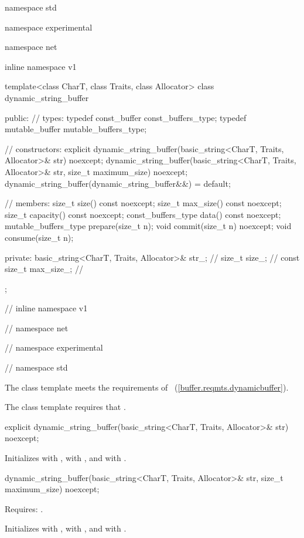 \begin{codeblock}
namespace std {
namespace experimental {
namespace net {
inline namespace v1 {

  template<class CharT, class Traits, class Allocator>
  class dynamic_string_buffer
  {
  public:
    // types:
    typedef const_buffer const_buffers_type;
    typedef mutable_buffer mutable_buffers_type;

    // constructors:
    explicit dynamic_string_buffer(basic_string<CharT, Traits, Allocator>& str) noexcept;
    dynamic_string_buffer(basic_string<CharT, Traits, Allocator>& str,
                          size_t maximum_size) noexcept;
    dynamic_string_buffer(dynamic_string_buffer&&) = default;

    // members:
    size_t size() const noexcept;
    size_t max_size() const noexcept;
    size_t capacity() const noexcept;
    const_buffers_type data() const noexcept;
    mutable_buffers_type prepare(size_t n);
    void commit(size_t n) noexcept;
    void consume(size_t n);

  private:
    basic_string<CharT, Traits, Allocator>& str_; // \expos
    size_t size_; // \expos
    const size_t max_size_; // \expos
  };

} // inline namespace v1
} // namespace net
} // namespace experimental
} // namespace std
\end{codeblock}

\pnum
The  class template meets the requirements of ~(\ref{buffer.reqmts.dynamicbuffer}).

\pnum
The  class template requires that .

\begin{itemdecl}
explicit dynamic_string_buffer(basic_string<CharT, Traits, Allocator>& str) noexcept;
\end{itemdecl}

\begin{itemdescr}
\pnum
\effects Initializes  with ,  with , and  with .
\end{itemdescr}

\begin{itemdecl}
dynamic_string_buffer(basic_string<CharT, Traits, Allocator>& str,
                      size_t maximum_size) noexcept;
\end{itemdecl}

\begin{itemdescr}
\pnum
Requires: .

\pnum
\effects Initializes  with ,  with , and  with .
\end{itemdescr}

